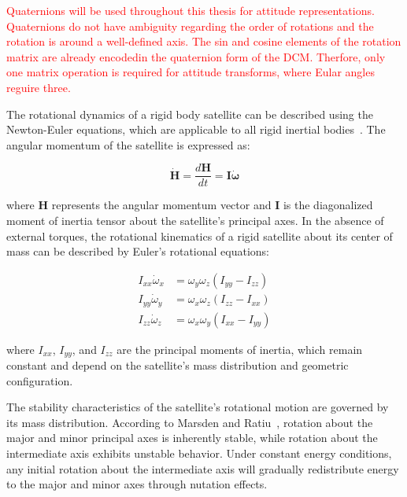 \textcolor{red}{Quaternions will be used throughout this thesis for attitude representations. Quaternions do not have ambiguity regarding the order of rotations
and the rotation is around a well-defined axis. The sin and cosine elements of the rotation matrix are already encodedin the quaternion form of the DCM. Therfore,
only one matrix operation is required for attitude transforms, where Eular angles reguire three.}


\label{sec:dynamics}

The rotational dynamics of a rigid body satellite can be described using the Newton-Euler equations, 
which are applicable to all rigid inertial bodies~\cite{ref36}. The angular momentum of the satellite is expressed as:

\begin{equation}
\dot{\mathbf{H}} = \frac{d\mathbf{H}}{dt} = \mathbf{I}\dot{\boldsymbol{\omega}}
\end{equation}

\noindent where $\mathbf{H}$ represents the angular momentum vector and $\mathbf{I}$ is the diagonalized moment of 
inertia tensor about the satellite's principal axes. In the absence of external torques, the rotational kinematics 
of a rigid satellite about its center of mass can be described by Euler's rotational equations:

\begin{align}
I_{xx}\dot{\omega}_x &= \omega_y\omega_z(I_{yy} - I_{zz}) \\
I_{yy}\dot{\omega}_y &= \omega_x\omega_z(I_{zz} - I_{xx}) \\
I_{zz}\dot{\omega}_z &= \omega_x\omega_y(I_{xx} - I_{yy})
\end{align}

\noindent where $I_{xx}$, $I_{yy}$, and $I_{zz}$ are the principal moments of inertia, which remain constant and 
depend on the satellite's mass distribution and geometric configuration. 

The stability characteristics of the satellite's rotational 
motion are governed by its mass distribution. According to Marsden and Ratiu~\cite{ref37}, rotation about the major and minor principal 
axes is inherently stable, while rotation about the intermediate axis exhibits unstable behavior. Under constant energy conditions, any 
initial rotation about the intermediate axis will gradually redistribute energy to the major and minor axes through nutation effects.

